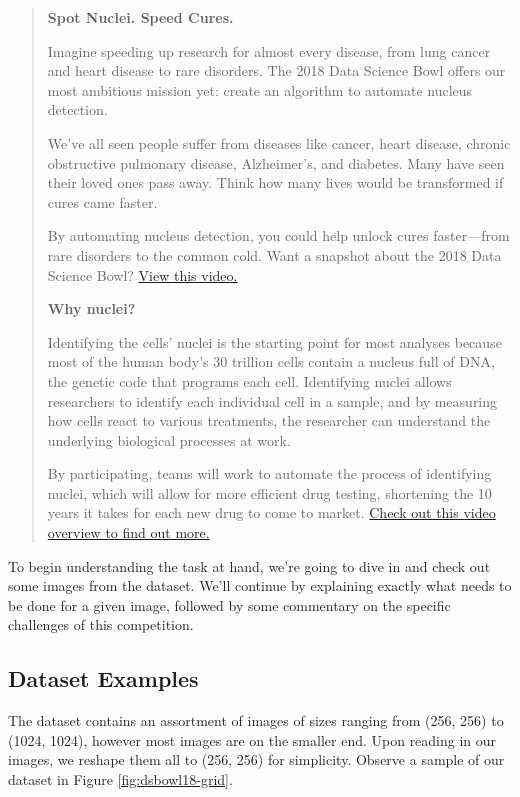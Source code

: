 \documentclass[paper=letter, fontsize=12pt]{article}
\numberwithin{equation}{section} %
\numberwithin{figure}{section} %
\numberwithin{table}{section} %
\begin{document}
\begin{quote}
    \textbf{\large Spot Nuclei. Speed Cures.}

    Imagine speeding up research for almost every disease, from lung cancer and
    heart disease to rare disorders. The 2018 Data Science Bowl offers our most
    ambitious mission yet: create an algorithm to automate nucleus detection.

    We've all seen people suffer from diseases like cancer, heart disease,
    chronic obstructive pulmonary disease, Alzheimer's, and diabetes. Many have
    seen their loved ones pass away. Think how many lives would be transformed
    if cures came faster.

    By automating nucleus detection, you could help unlock cures faster—from
    rare disorders to the common cold. Want a snapshot about the 2018 Data
    Science Bowl? \href{https://www.youtube.com/watch?v=eHwkfhmJexs}{View this
    video.}

    \textbf{\large Why nuclei?}

    Identifying the cells' nuclei is the starting point for most analyses
    because most of the human body's 30 trillion cells contain a nucleus full
    of DNA, the genetic code that programs each cell. Identifying nuclei allows
    researchers to identify each individual cell in a sample, and by measuring
    how cells react to various treatments, the researcher can understand the
    underlying biological processes at work.

    By participating, teams will work to automate the process of identifying
    nuclei, which will allow for more efficient drug testing, shortening the 10
    years it takes for each new drug to come to market.
    \href{https://datasciencebowl.com/2018dsbtutorial/}{Check out this video
    overview to find out more.}
\end{quote}

To begin understanding the task at hand, we're going to dive in and check out 
some images from the dataset.  We'll continue by explaining exactly what needs
to be done for a given image, followed by some commentary on the specific 
challenges of this competition.

\subsection{Dataset Examples}

The dataset contains an assortment of images of sizes ranging from (256, 256)
to (1024, 1024), however most images are on the smaller end.  Upon reading in
our images, we reshape them all to (256, 256) for simplicity.  Observe a sample
of our dataset in Figure \ref{fig:dsbowl18-grid}.
\end{document}
